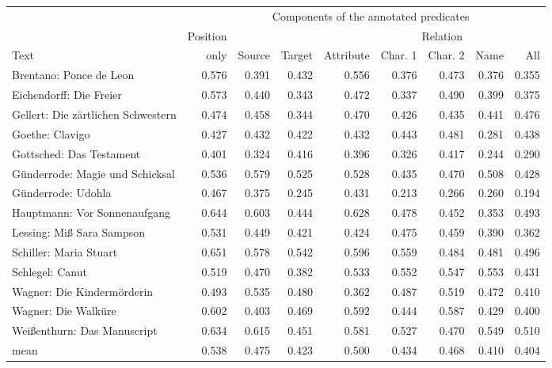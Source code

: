 \documentclass[border=0.2cm]{standalone}
\begin{document}
\begin{tabular}{lrrrrrrrr}
\toprule
 & & \multicolumn{6}{c}{Components of the annotated predicates} &  \\
\cmidrule{3-8}
& {Position} & & & & \multicolumn{3}{c}{Relation} & \\
\cmidrule{6-8}
Text & {only} & {Source} & {Target} & {Attribute} & {Char. 1} & {Char. 2} & {Name} & {All} \\
\midrule
Brentano: Ponce de Leon  & 0.576 & 0.391 & 0.432 & 0.556 & 0.376 & 0.473 & 0.376 & 0.355 \\
Eichendorff: Die Freier & 0.573 & 0.440 & 0.343 & 0.472 & 0.337 & 0.490 & 0.399 & 0.375 \\
Gellert: Die zärtlichen Schwestern & 0.474 & 0.458 & 0.344 & 0.470 & 0.426 & 0.435 & 0.441 & 0.476 \\
Goethe: Clavigo & 0.427 & 0.432 & 0.422 & 0.432 & 0.443 & 0.481 & 0.281 & 0.438 \\
Gottsched: Das Testament & 0.401 & 0.324 & 0.416 & 0.396 & 0.326 & 0.417 & 0.244 & 0.290 \\
Günderrode: Magie und Schicksal & 0.536 & 0.579 & 0.525 & 0.528 & 0.435 & 0.470 & 0.508 & 0.428 \\
Günderrode: Udohla & 0.467 & 0.375 & 0.245 & 0.431 & 0.213 & 0.266 & 0.260 & 0.194 \\
Hauptmann: Vor Sonnenaufgang & 0.644 & 0.603 & 0.444 & 0.628 & 0.478 & 0.452 & 0.353 & 0.493 \\
Lessing: Miß Sara Sampson & 0.531 & 0.449 & 0.421 & 0.424 & 0.475 & 0.459 & 0.390 & 0.362 \\
Schiller: Maria Stuart & 0.651 & 0.578 & 0.542 & 0.596 & 0.559 & 0.484 & 0.481 & 0.496 \\
Schlegel: Canut & 0.519 & 0.470 & 0.382 & 0.533 & 0.552 & 0.547 & 0.553 & 0.431 \\
Wagner: Die Kindermörderin & 0.493 & 0.535 & 0.480 & 0.362 & 0.487 & 0.519 & 0.472 & 0.410 \\
Wagner: Die Walküre & 0.602 & 0.403 & 0.469 & 0.592 & 0.444 & 0.587 & 0.429 & 0.400 \\
Weißenthurn: Das Manuscript & 0.634 & 0.615 & 0.451 & 0.581 & 0.527 & 0.470 & 0.549 & 0.510 \\\midrule
mean & 0.538 & 0.475 & 0.423 & 0.500 & 0.434 & 0.468 & 0.410 & 0.404\\
\bottomrule
\end{tabular}
\end{document}
